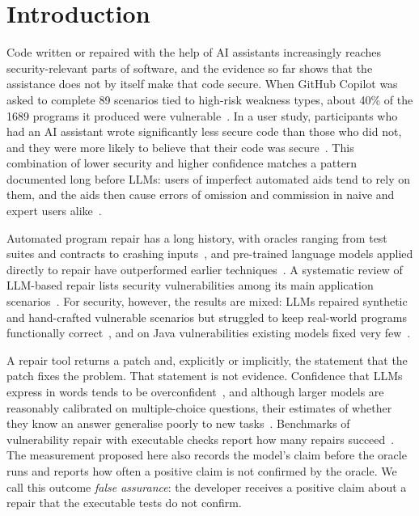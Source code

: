 \documentclass[ai,article,submit,oneauthor]{Definitions/mdpi}
\begin{document}
\section{Introduction}

Code written or repaired with the help of AI assistants increasingly reaches security-relevant parts of software, and the evidence so far shows that the assistance does not by itself make that code secure. When GitHub Copilot was asked to complete 89 scenarios tied to high-risk weakness types, about 40\% of the 1689 programs it produced were vulnerable~\cite{Pearce2022AsleepAtThe}. In a user study, participants who had an AI assistant wrote significantly less secure code than those who did not, and they were more likely to believe that their code was secure~\cite{Perry2023DoUsersWrite}. This combination of lower security and higher confidence matches a pattern documented long before LLMs: users of imperfect automated aids tend to rely on them, and the aids then cause errors of omission and commission in naive and expert users alike~\cite{Parasuraman2010ComplacencyAndBias}.

Automated program repair has a long history, with oracles ranging from test suites and contracts to crashing inputs~\cite{Monperrus2018AutomaticSoftwareRepair}, and pre-trained language models applied directly to repair have outperformed earlier techniques~\cite{Xia2023AutomatedProgramRepair}. A systematic review of LLM-based repair lists security vulnerabilities among its main application scenarios~\cite{Zhang2024SystematicLiteratureReview}. For security, however, the results are mixed: LLMs repaired synthetic and hand-crafted vulnerable scenarios but struggled to keep real-world programs functionally correct~\cite{Pearce2023ExaminingZeroShot}, and on Java vulnerabilities existing models fixed very few~\cite{Wu2023HowEffectiveAre}.

A repair tool returns a patch and, explicitly or implicitly, the statement that the patch fixes the problem. That statement is not evidence. Confidence that LLMs express in words tends to be overconfident~\cite{Xiong2024CanLlmsExpress}, and although larger models are reasonably calibrated on multiple-choice questions, their estimates of whether they know an answer generalise poorly to new tasks~\cite{Kadavath2022LanguageModelsMostly}. Benchmarks of vulnerability repair with executable checks report how many repairs succeed~\cite{Bui2022Vul4jDatasetOf,Wei2025PatchevalNewBenchmark,Bui2026Vul4pyBenchmarkingAutomated}. The measurement proposed here also records the model's claim before the oracle runs and reports how often a positive claim is not confirmed by the oracle. We call this outcome \emph{false assurance}: the developer receives a positive claim about a repair that the executable tests do not confirm.
\end{document}

